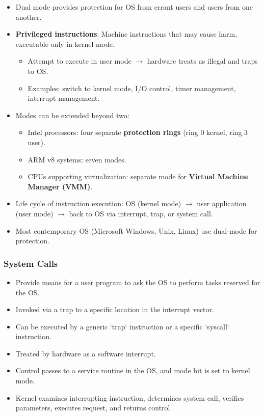 \documentclass{article}
\begin{document}
\begin{itemize}
    \item Dual mode provides protection for OS from errant users and users from one another.
    \item \textbf{Privileged instructions}: Machine instructions that may cause harm, executable only in kernel mode.
    \begin{itemize}
        \item Attempt to execute in user mode $\rightarrow$ hardware treats as illegal and traps to OS.
        \item Examples: switch to kernel mode, I/O control, timer management, interrupt management.
    \end{itemize}
    \item Modes can be extended beyond two:
    \begin{itemize}
        \item Intel processors: four separate \textbf{protection rings} (ring 0 kernel, ring 3 user).
        \item ARM v8 systems: seven modes.
        \item CPUs supporting virtualization: separate mode for \textbf{Virtual Machine Manager (VMM)}.
    \end{itemize}
    \item Life cycle of instruction execution: OS (kernel mode) $\rightarrow$ user application (user mode) $\rightarrow$ back to OS via interrupt, trap, or system call.
    \item Most contemporary OS (Microsoft Windows, Unix, Linux) use dual-mode for protection.
\end{itemize}

\subsubsection*{System Calls}
\begin{itemize}
    \item Provide means for a user program to ask the OS to perform tasks reserved for the OS.
    \item Invoked via a trap to a specific location in the interrupt vector.
    \item Can be executed by a generic `trap` instruction or a specific `syscall` instruction.
    \item Treated by hardware as a software interrupt.
    \item Control passes to a service routine in the OS, and mode bit is set to kernel mode.
    \item Kernel examines interrupting instruction, determines system call, verifies parameters, executes request, and returns control.
\end{itemize}
\end{document}
